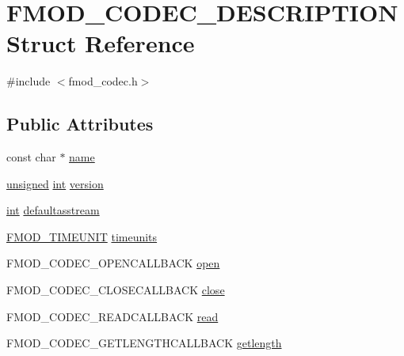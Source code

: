 \hypertarget{struct_f_m_o_d___c_o_d_e_c___d_e_s_c_r_i_p_t_i_o_n}{\section{F\-M\-O\-D\-\_\-\-C\-O\-D\-E\-C\-\_\-\-D\-E\-S\-C\-R\-I\-P\-T\-I\-O\-N Struct Reference}
\label{struct_f_m_o_d___c_o_d_e_c___d_e_s_c_r_i_p_t_i_o_n}
}


{\ttfamily \#include $<$fmod\-\_\-codec.\-h$>$}

\subsection*{Public Attributes}
\begin{DoxyCompactItemize}
\item 
const char $\ast$ \hyperlink{struct_f_m_o_d___c_o_d_e_c___d_e_s_c_r_i_p_t_i_o_n_a3d2d1cb50c8d3fcee03e465753a9adb0}{name}
\item 
\hyperlink{_free_image_8h_a425076c7067a1b5166e2cc530e914814}{unsigned} \hyperlink{wglew_8h_a500a82aecba06f4550f6849b8099ca21}{int} \hyperlink{struct_f_m_o_d___c_o_d_e_c___d_e_s_c_r_i_p_t_i_o_n_a8dfb836ca79931ee6ca39c12bd8aad3f}{version}
\item 
\hyperlink{wglew_8h_a500a82aecba06f4550f6849b8099ca21}{int} \hyperlink{struct_f_m_o_d___c_o_d_e_c___d_e_s_c_r_i_p_t_i_o_n_ac79461b38a89c34d2ec2e609736df941}{defaultasstream}
\item 
\hyperlink{fmod_8h_a9999089b44f00c72ba8e9a270a8d6349}{F\-M\-O\-D\-\_\-\-T\-I\-M\-E\-U\-N\-I\-T} \hyperlink{struct_f_m_o_d___c_o_d_e_c___d_e_s_c_r_i_p_t_i_o_n_a17d05f38ea3ea759d20d463aa8a8ca9f}{timeunits}
\item 
F\-M\-O\-D\-\_\-\-C\-O\-D\-E\-C\-\_\-\-O\-P\-E\-N\-C\-A\-L\-L\-B\-A\-C\-K \hyperlink{struct_f_m_o_d___c_o_d_e_c___d_e_s_c_r_i_p_t_i_o_n_a6cd1d60659e4c2f1013f3b98924d51a7}{open}
\item 
F\-M\-O\-D\-\_\-\-C\-O\-D\-E\-C\-\_\-\-C\-L\-O\-S\-E\-C\-A\-L\-L\-B\-A\-C\-K \hyperlink{struct_f_m_o_d___c_o_d_e_c___d_e_s_c_r_i_p_t_i_o_n_aa628c3f28fd817bd36876fd845fd1df6}{close}
\item 
F\-M\-O\-D\-\_\-\-C\-O\-D\-E\-C\-\_\-\-R\-E\-A\-D\-C\-A\-L\-L\-B\-A\-C\-K \hyperlink{struct_f_m_o_d___c_o_d_e_c___d_e_s_c_r_i_p_t_i_o_n_ac64375412d9cd6e73fdf0d9aea0ca37a}{read}
\item 
F\-M\-O\-D\-\_\-\-C\-O\-D\-E\-C\-\_\-\-G\-E\-T\-L\-E\-N\-G\-T\-H\-C\-A\-L\-L\-B\-A\-C\-K \hyperlink{struct_f_m_o_d___c_o_d_e_c___d_e_s_c_r_i_p_t_i_o_n_a83a086b8d6537aa0c7c271fc2adb4fbf}{getlength}

\end{DoxyCompactItemize}
